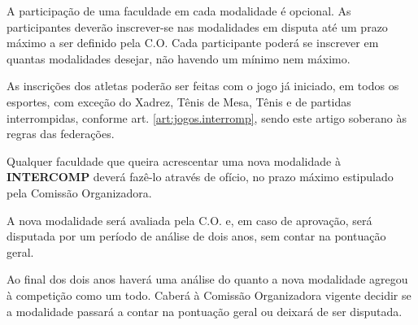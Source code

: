 \begin{article}
	A participação de uma faculdade em cada modalidade é opcional. As participantes deverão inscrever-se nas modalidades em disputa até um prazo máximo a ser definido pela C.O. Cada participante poderá se inscrever em quantas modalidades desejar, não havendo um mínimo nem máximo.
\end{article}

\begin{article}
	As inscrições dos atletas poderão ser feitas com o jogo já iniciado, em todos os esportes, com exceção do Xadrez, Tênis de Mesa, Tênis e de partidas interrompidas, conforme art. \ref{art:jogos.interromp}\ulo, sendo este artigo soberano às regras das federações.
\end{article}

\begin{article}
	Qualquer faculdade que queira acrescentar uma nova modalidade à \textbf{INTERCOMP} deverá fazê-lo através de ofício, no prazo máximo estipulado pela Comissão Organizadora.

	\begin{xparagraph}
		A nova modalidade será avaliada pela C.O. e, em caso de aprovação, será disputada por um período de análise de dois anos, sem contar na pontuação geral.
	\end{xparagraph}

	\begin{xparagraph}
		Ao final dos dois anos haverá uma análise do quanto a nova modalidade agregou à competição como um todo. Caberá à Comissão Organizadora vigente decidir se a modalidade passará a contar na pontuação geral ou deixará de ser disputada.
	\end{xparagraph}
\end{article}

